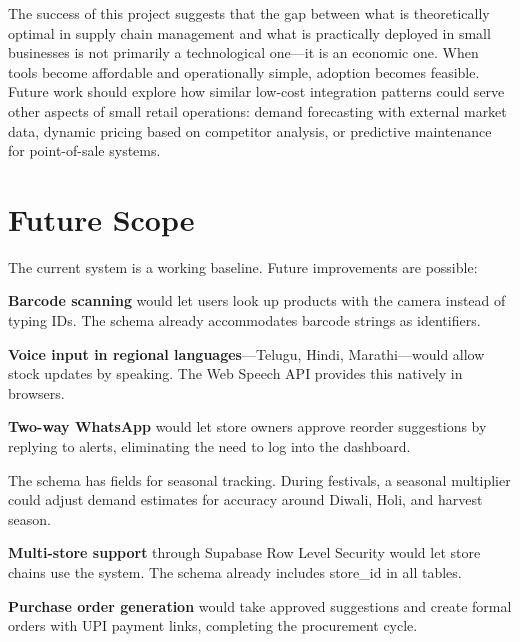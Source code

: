 \documentclass[journal]{IEEEtran}
\begin{document}
The success of this project suggests that the gap between what is theoretically optimal in supply chain management and what is practically deployed in small businesses is not primarily a technological one---it is an economic one. When tools become affordable and operationally simple, adoption becomes feasible. Future work should explore how similar low-cost integration patterns could serve other aspects of small retail operations: demand forecasting with external market data, dynamic pricing based on competitor analysis, or predictive maintenance for point-of-sale systems.

\section{Future Scope}

\label{sec:future}

The current system is a working baseline. Future improvements are possible:

\textbf{Barcode scanning} would let users look up products with the camera instead of typing IDs. The schema already accommodates barcode strings as identifiers.

\textbf{Voice input in regional languages}---Telugu, Hindi, Marathi---would allow stock updates by speaking. The Web Speech API provides this natively in browsers.

\textbf{Two-way WhatsApp} would let store owners approve reorder suggestions by replying to alerts, eliminating the need to log into the dashboard.

The schema has fields for seasonal tracking. During festivals, a seasonal multiplier could adjust demand estimates for accuracy around Diwali, Holi, and harvest season.

\textbf{Multi-store support} through Supabase Row Level Security would let store chains use the system. The schema already includes store_id in all tables.

\textbf{Purchase order generation} would take approved suggestions and create formal orders with UPI payment links, completing the procurement cycle.
\end{document}
